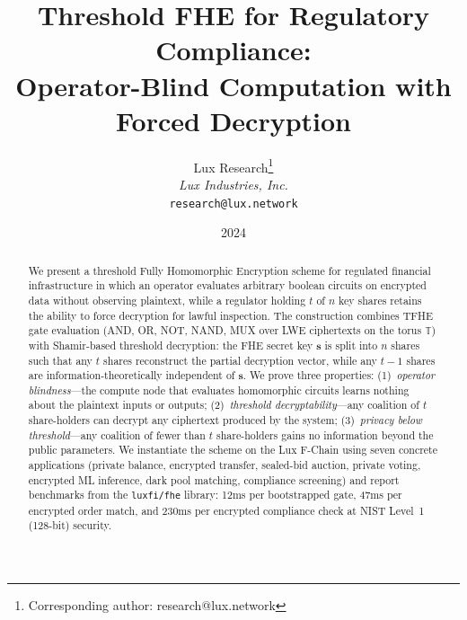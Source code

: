 \documentclass[11pt,a4paper]{article}
\title{Threshold FHE for Regulatory Compliance:\\Operator-Blind Computation with Forced Decryption}
\author{
Lux Research\thanks{Corresponding author: research@lux.network}\\
\textit{Lux Industries, Inc.}\\
\texttt{research@lux.network}
}
\date{2024}
\begin{document}
\luxcoverpage

\begin{abstract}
We present a threshold Fully Homomorphic Encryption scheme for regulated
financial infrastructure in which an operator evaluates arbitrary boolean
circuits on encrypted data without observing plaintext, while a regulator
holding $t$ of $n$ key shares retains the ability to force decryption for
lawful inspection.  The construction combines TFHE gate evaluation (AND, OR,
NOT, NAND, MUX over LWE ciphertexts on the torus $\mathbb{T}$) with
Shamir-based threshold decryption: the FHE secret key $\mathbf{s}$ is split
into $n$ shares such that any $t$ shares reconstruct the partial decryption
vector, while any $t-1$ shares are information-theoretically independent
of $\mathbf{s}$.  We prove three properties: (1)~\emph{operator blindness}---the
compute node that evaluates homomorphic circuits learns nothing about the
plaintext inputs or outputs; (2)~\emph{threshold decryptability}---any
coalition of $t$ share-holders can decrypt any ciphertext produced by
the system; (3)~\emph{privacy below threshold}---any coalition of fewer
than $t$ share-holders gains no information beyond the public parameters.
We instantiate the scheme on the Lux F-Chain using seven concrete
applications (private balance, encrypted transfer, sealed-bid auction,
private voting, encrypted ML inference, dark pool matching, compliance
screening) and report benchmarks from the \texttt{luxfi/fhe} library:
12ms per bootstrapped gate, 47ms per encrypted order match, and 230ms
per encrypted compliance check at NIST Level~1 (128-bit) security.
\end{abstract}

\tableofcontents
\newpage












\end{document}
